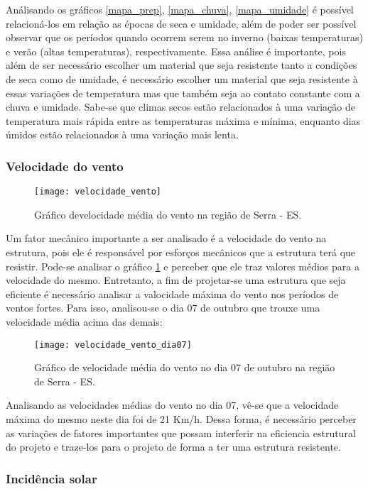 Análisando os gráficos \ref{mapa_prep}, \ref{mapa_chuva}, \ref{mapa_umidade} é possível relacioná-los em relação as épocas de seca e umidade, além de poder ser possível observar que os períodos quando ocorrem serem no inverno (baixas temperaturas) e verão (altas temperaturas), respectivamente. Essa análise é importante, pois além de ser necessário escolher um material que seja resistente tanto a condições de seca como de umidade, é necessário escolher um material que seja resistente à essas variações de temperatura mas que também seja ao contato constante com a chuva e umidade. Sabe-se que climas secos estão relacionados à uma variação de temperatura mais rápida entre as temperaturas máxima e mínima, enquanto dias úmidos estão relacionados à uma variação mais lenta.
 
\subsubsection{Velocidade do vento}

\begin{figure}[!ht]
	\texttt{[image: velocidade\_vento]}
	\centering
	\caption{Gráfico develocidade média do vento na região de Serra - ES.}
	\label{vel_vento}
\end{figure}

Um fator mecânico importante a ser analisado é a velocidade do vento na estrutura, pois ele é responsável por esforços mecânicos que a estrutura terá que resistir. Pode-se analisar o gráfico \ref{vel_vento} e perceber que ele traz valores médios para a velocidade do mesmo. Entretanto, a fim de projetar-se uma estrutura que seja eficiente é necessário analisar a valocidade máxima do vento nos períodos de ventos fortes. Para isso, analisou-se o dia 07 de outubro que trouxe uma velocidade média acima das demais:

\begin{figure}[!ht]
	\texttt{[image: velocidade\_vento\_dia07]}
	\centering
	\caption{Gráfico de velocidade média do vento no dia 07 de outubro na região de Serra - ES.}
\end{figure}

Analisando as velocidades médias do vento no dia 07, vê-se que a velocidade máxima do mesmo neste dia foi de 21 Km/h. Dessa forma, é necessário perceber as variações de fatores importantes que possam interferir na eficiencia estrutural do projeto e traze-los para o projeto de forma a ter uma estrutura resistente.


\subsubsection{Incidência solar}


